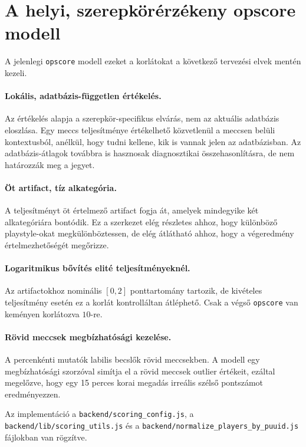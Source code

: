 ﻿\documentclass[a4paper,12pt]{report}
\begin{document}
\section{A helyi, szerepkörérzékeny opscore modell}

A jelenlegi \texttt{opscore} modell ezeket a korlátokat a következő tervezési elvek mentén kezeli.

\paragraph{Lokális, adatbázis-független értékelés.}
Az értékelés alapja a szerepkör-specifikus elvárás, nem az aktuális adatbázis eloszlása. Egy meccs teljesítménye értékelhető közvetlenül a meccsen belüli kontextusból, anélkül, hogy tudni kellene, kik is vannak jelen az adatbázisban. Az adatbázis-átlagok továbbra is hasznosak diagnosztikai összehasonlításra, de nem határozzák meg a jegyet.

\paragraph{Öt artifact, tíz alkategória.}
A teljesítményt öt értelmező artifact fogja át, amelyek mindegyike két alkategóriára bontódik. Ez a szerkezet elég részletes ahhoz, hogy különböző playstyle-okat megkülönböztessen, de elég átlátható ahhoz, hogy a végeredmény értelmezhetőségét megőrizze.

\paragraph{Logaritmikus bővítés elité teljesítményeknél.}
Az artifactokhoz nominális $[0, 2]$ ponttartomány tartozik, de kivételes teljesítmény esetén ez a korlát kontrolláltan átléphető. Csak a végső \texttt{opscore} van keményen korlátozva $10$-re.

\paragraph{Rövid meccsek megbízhatósági kezelése.}
A percenkénti mutatók labilis becslők rövid meccsekben. A modell egy megbízhatósági szorzóval simítja el a rövid meccsek outlier értékeit, ezáltal megelőzve, hogy egy 15 perces korai megadás irreális szélső pontszámot eredményezzen.

Az implementáció a \texttt{backend/scoring\_config.js}, a \texttt{backend/lib/scoring\_utils.js} és a \texttt{backend/normalize\_players\_by\_puuid.js} fájlokban van rögzítve.
\end{document}
